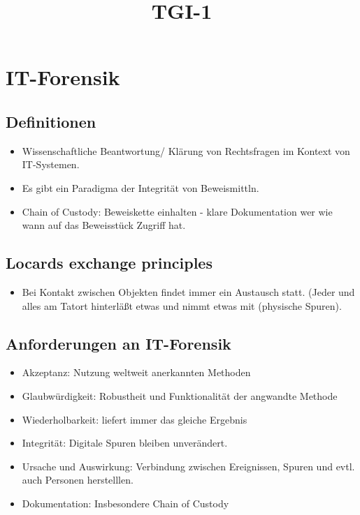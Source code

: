 \documentclass[a4paper,10pt]{scrartcl}
\title{TGI-1}
\author{}
\begin{document}
\section{IT-Forensik}
\subsection{Definitionen}

\begin{itemize}
 \item Wissenschaftliche Beantwortung/ Klärung von Rechtsfragen im Kontext von IT-Systemen. 
 \item Es gibt ein Paradigma der Integrität von Beweismittln.
 \item Chain of Custody: Beweiskette einhalten - klare Dokumentation wer wie wann auf das Beweisstück Zugriff hat.
\end{itemize}

\subsection{Locards exchange principles}
\begin{itemize}
 \item Bei Kontakt zwischen Objekten findet immer ein Austausch statt. (Jeder und alles am Tatort hinterläßt etwas und nimmt etwas mit (physische Spuren).
\end{itemize}

\subsection{Anforderungen an IT-Forensik}

\begin{itemize}
 \item Akzeptanz: Nutzung weltweit anerkannten Methoden
 \item Glaubwürdigkeit: Robustheit und Funktionalität der angwandte Methode 
 \item Wiederholbarkeit: liefert immer das gleiche Ergebnis
 \item Integrität: Digitale Spuren bleiben unverändert.
 \item Ursache und Auswirkung: Verbindung zwischen Ereignissen, Spuren und evtl. auch Personen herstelllen.
 \item Dokumentation: Insbesondere Chain of Custody
\end{itemize}
\end{document}
